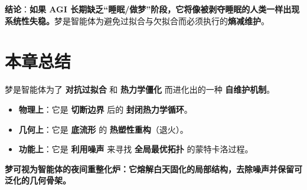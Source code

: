 \textbf{结论}：\textbf{如果 AGI 长期缺乏“睡眠/做梦”阶段，它将像被剥夺睡眠的人类一样出现系统性失稳。}梦是智能体为避免过拟合与欠拟合而必须执行的\textbf{熵减维护}。

\section*{本章总结}

梦是智能体为了 \textbf{对抗过拟合} 和 \textbf{热力学僵化} 而进化出的一种 \textbf{自维护机制}。

\begin{itemize}
    \item \textbf{物理上}：它是 \textbf{切断边界} 后的 \textbf{封闭热力学循环}。
    \item \textbf{几何上}：它是 \textbf{底流形} 的 \textbf{热塑性重构}（退火）。
    \item \textbf{功能上}：它是 \textbf{利用噪声} 来寻找 \textbf{全局最优拓扑} 的蒙特卡洛过程。
\end{itemize}

\textbf{梦可视为智能体的夜间重整化炉：它熔解白天固化的局部结构，去除噪声并保留可泛化的几何骨架。}


